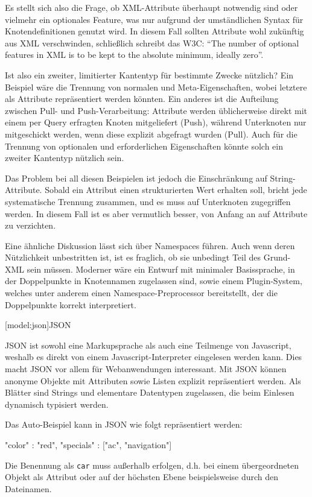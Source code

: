 \documentclass[11pt, a4paper, bibgerm]{scrbook}
\newcommand\icode[1]{\lstinline?#1?}
\newcommand\lsection{}
\begin{document}
Es stellt sich also die Frage, ob XML-Attribute überhaupt notwendig sind
oder vielmehr ein optionales Feature, was nur aufgrund der umständlichen
Syntax für Knotendefinitionen genutzt wird. In diesem Fall
sollten Attribute wohl zukünftig aus XML verschwinden, schließlich
schreibt das W3C\cite{XmlSpec}: "`The number of optional features in XML
is to be kept to the absolute minimum, ideally zero"'.

Ist also ein zweiter, limitierter Kantentyp für bestimmte Zwecke
nützlich? Ein Beispiel wäre die Trennung von normalen und
Meta-Eigenschaften, wobei letztere als Attribute repräsentiert werden
könnten. Ein anderes ist die Aufteilung zwischen Pull- und
Push-Verarbeitung: Attribute werden üblicherweise direkt mit einem per
Query erfragten Knoten mitgeliefert (Push), während Unterknoten nur
mitgeschickt werden, wenn diese explizit abgefragt wurden (Pull). Auch
für die Trennung von optionalen und erforderlichen Eigenschaften könnte
solch ein zweiter Kantentyp nützlich sein.

Das Problem bei all diesen Beispielen ist jedoch die Einschränkung auf
String-Attribute. Sobald ein Attribut einen strukturierten Wert erhalten
soll, bricht jede systematische Trennung zusammen, und es muss auf
Unterknoten zugegriffen werden. In diesem Fall ist es aber vermutlich
besser, von Anfang an auf Attribute zu verzichten.

Eine ähnliche Diskussion lässt sich über Namespaces führen. Auch wenn
deren Nützlichkeit unbestritten ist, ist es fraglich, ob sie unbedingt
Teil des Grund-XML sein müssen. Moderner wäre ein Entwurf mit
minimaler Basissprache, in der Doppelpunkte in Knotennamen zugelassen
sind, sowie einem Plugin-System, welches unter anderem einen
Namespace-Preprocessor bereitstellt, der die Doppelpunkte korrekt
interpretiert.

\lsection[model:json]{JSON}

JSON ist sowohl eine Markupsprache als auch eine Teilmenge von
Javascript, weshalb es direkt von einem Javascript-Interpreter
eingelesen werden kann. Dies macht JSON vor allem für Webanwendungen
interessant. Mit JSON können anonyme Objekte mit Attributen sowie Listen
explizit repräsentiert werden. Als Blätter sind Strings und elementare
Datentypen zugelassen, die beim Einlesen dynamisch typisiert werden.

Das Auto-Beispiel kann in JSON wie folgt repräsentiert werden:
\begin{code}
{
  "color"    : "red",
  "specials" : ["ac", "navigation"]
}
\end{code}
Die Benennung als \icode{car} muss außerhalb erfolgen, d.h. bei einem
übergeordneten Objekt als Attribut oder auf der höchsten Ebene
beispielsweise durch den Dateinamen.
\end{document}
